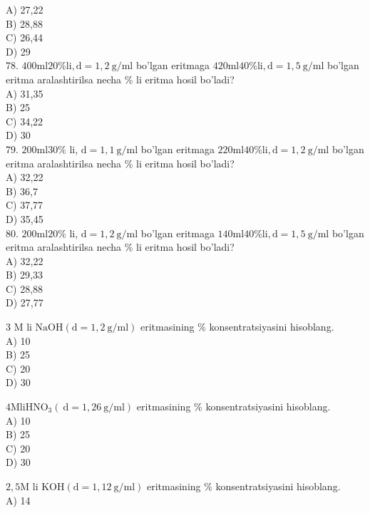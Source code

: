 A) 27,22\\
B) 28,88\\
C) 26,44\\
D) 29\\
78. $400 \mathrm{ml} 20 \% \mathrm{li}, \mathrm{d}=1,2 \mathrm{~g} / \mathrm{ml}$ bo'lgan eritmaga $420 \mathrm{ml} 40 \% \mathrm{li}, \mathrm{d}=1,5 \mathrm{~g} / \mathrm{ml}$ bo'lgan eritma aralashtirilsa necha \% li eritma hosil bo'ladi?\\
A) 31,35\\
B) 25\\
C) 34,22\\
D) 30\\
79. $200 \mathrm{ml} 30 \%$ li, $\mathrm{d}=1,1 \mathrm{~g} / \mathrm{ml}$ bo'lgan eritmaga $220 \mathrm{ml} 40 \% \mathrm{li}, \mathrm{d}=1,2 \mathrm{~g} / \mathrm{ml}$ bo'lgan eritma aralashtirilsa necha \% li eritma hosil bo'ladi?\\
A) 32,22\\
B) 36,7\\
C) 37,77\\
D) 35,45\\
80. $200 \mathrm{ml} 20 \%$ li, $\mathrm{d}=1,2 \mathrm{~g} / \mathrm{ml}$ bo'lgan eritmaga $140 \mathrm{ml} 40 \% \mathrm{li}, \mathrm{d}=1,5 \mathrm{~g} / \mathrm{ml}$ bo'lgan eritma aralashtirilsa necha \% li eritma hosil bo'ladi?\\
A) 32,22\\
B) 29,33\\
C) 28,88\\
D) 27,77
  \item 3 M li $\mathrm{NaOH}(\mathrm{d}=1,2 \mathrm{~g} / \mathrm{ml})$ eritmasining \% konsentratsiyasini hisoblang.\\
A) 10\\
B) 25\\
C) 20\\
D) 30\\
  \item $4 \mathrm{M} \mathrm{li} \mathrm{HNO}{ }_{3}(\mathrm{~d}=1,26 \mathrm{~g} / \mathrm{ml})$ eritmasining \% konsentratsiyasini hisoblang.\\
A) 10\\
B) 25\\
C) 20\\
D) 30
  \item $2,5 \mathrm{M}$ li $\mathrm{KOH}(\mathrm{d}=1,12 \mathrm{~g} / \mathrm{ml})$ eritmasining \% konsentratsiyasini hisoblang.\\
A) 14\\
